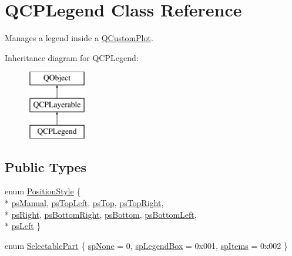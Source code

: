 \hypertarget{classQCPLegend}{\section{Q\-C\-P\-Legend Class Reference}
\label{classQCPLegend}
}


Manages a legend inside a \hyperlink{classQCustomPlot}{Q\-Custom\-Plot}.  


Inheritance diagram for Q\-C\-P\-Legend\-:\begin{figure}[H]
\begin{center}
\leavevmode
\includegraphics[height=3.000000cm]{classQCPLegend}
\end{center}
\end{figure}
\subsection*{Public Types}
\begin{DoxyCompactItemize}
\item 
enum \hyperlink{classQCPLegend_aa61c3d82a6c7942dddefbf1ed1f7049f}{Position\-Style} \{ \\*
\hyperlink{classQCPLegend_aa61c3d82a6c7942dddefbf1ed1f7049fadfd57c395cae91cd95231c926c0a38ca}{ps\-Manual}, 
\hyperlink{classQCPLegend_aa61c3d82a6c7942dddefbf1ed1f7049fa1f5bb82f19be99ee3722a540b76c3c85}{ps\-Top\-Left}, 
\hyperlink{classQCPLegend_aa61c3d82a6c7942dddefbf1ed1f7049fa7ca820289c7938092f497fbd4d706f5d}{ps\-Top}, 
\hyperlink{classQCPLegend_aa61c3d82a6c7942dddefbf1ed1f7049fadc969b13706ba4fd802bbc27e0abb18a}{ps\-Top\-Right}, 
\\*
\hyperlink{classQCPLegend_aa61c3d82a6c7942dddefbf1ed1f7049fa71969c414ec15afabe2761131ad85766}{ps\-Right}, 
\hyperlink{classQCPLegend_aa61c3d82a6c7942dddefbf1ed1f7049faf4120842dbc223cf8523188f15146d31}{ps\-Bottom\-Right}, 
\hyperlink{classQCPLegend_aa61c3d82a6c7942dddefbf1ed1f7049fac32970f4bf28ef780f15365abcc9fbd3}{ps\-Bottom}, 
\hyperlink{classQCPLegend_aa61c3d82a6c7942dddefbf1ed1f7049fa36e2c1900a0d39596ee26074c7815ee9}{ps\-Bottom\-Left}, 
\\*
\hyperlink{classQCPLegend_aa61c3d82a6c7942dddefbf1ed1f7049fac9c7c1c0f8d1894792fbb71854002ebe}{ps\-Left}
 \}
\item 
enum \hyperlink{classQCPLegend_a5404de8bc1e4a994ca4ae69e2c7072f1}{Selectable\-Part} \{ \hyperlink{classQCPLegend_a5404de8bc1e4a994ca4ae69e2c7072f1a378201c07d500af7126e3ec91652eed7}{sp\-None} = 0, 
\hyperlink{classQCPLegend_a5404de8bc1e4a994ca4ae69e2c7072f1a0fa4758962a46fa1dc9da818abae23c4}{sp\-Legend\-Box} = 0x001, 
\hyperlink{classQCPLegend_a5404de8bc1e4a994ca4ae69e2c7072f1a768bfb95f323db4c66473375032c0af7}{sp\-Items} = 0x002
 \}
\end{DoxyCompactItemize}
